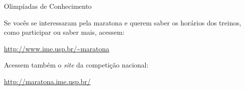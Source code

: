 \begin{subsecao}{Olimpíadas de Conhecimento}
\begin{itemize}
Se vocês se interessaram pela maratona e querem saber os horários dos
treinos, como participar ou saber mais, acessem:

\url{http://www.ime.usp.br/~maratona}

Acessem também o \textit{site} da competição nacional:

\url{http://maratona.ime.usp.br/}

\end{itemize}


\end{subsecao}
